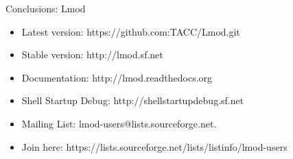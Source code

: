 \documentclass{beamer}
\begin{document}
\begin{frame}{Conclusions: Lmod}
  \begin{itemize}
    \item Latest version: https://github.com:TACC/Lmod.git
    \item Stable version: http://lmod.sf.net
    \item Documentation:  http://lmod.readthedocs.org
    \item Shell Startup Debug: http://shellstartupdebug.sf.net
    \item Mailing List:   lmod-users@lists.sourceforge.net.
    \item Join here: https://lists.sourceforge.net/lists/listinfo/lmod-users
  \end{itemize}
\end{frame}
\end{document}
